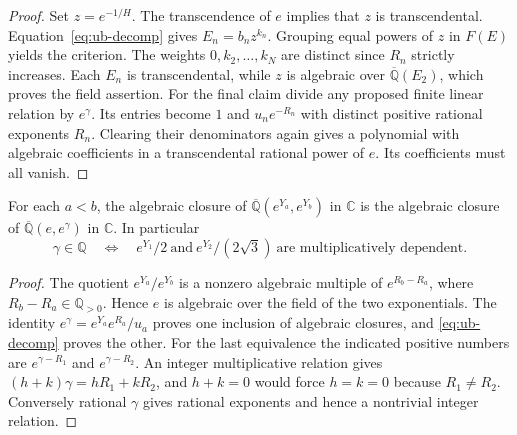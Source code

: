\documentclass[11pt,a4paper]{article}
\theoremstyle{definition}\newtheorem{definition}[theorem]{Definition}\newtheorem{example}[theorem]{Example}
\theoremstyle{remark}\newtheorem{remark}[theorem]{Remark}
\newcommand{\Q}{\mathbb Q}\newcommand{\Z}{\mathbb Z}\newcommand{\R}{\mathbb R}\newcommand{\N}{\mathbb N}
\begin{document}
\begin{proof}
Set $z=e^{-1/H}$. The transcendence of $e$ implies that $z$ is
transcendental. Equation~\eqref{eq:ub-decomp} gives
$E_n=b_nz^{k_n}$. Grouping equal powers of $z$ in $F(E)$ yields the
criterion. The weights $0,k_2,\ldots,k_N$ are distinct since $R_n$
strictly increases. Each $E_n$ is transcendental, while $z$ is
algebraic over $\overline{\Q}(E_2)$, which proves the field assertion.
For the final claim divide any proposed finite linear relation by
$e^\gamma$. Its entries become $1$ and $u_ne^{-R_n}$ with distinct
positive rational exponents $R_n$. Clearing their denominators again
gives a polynomial with algebraic coefficients in a transcendental
rational power of $e$. Its coefficients must all vanish.
\end{proof}

\begin{corollary}
\label{cor:ub-exp-gamma}
For each $a<b$, the algebraic closure of
$\overline{\Q}(e^{Y_a},e^{Y_b})$ in $\mathbb C$ is the algebraic
closure of $\overline{\Q}(e,e^\gamma)$ in $\mathbb C$. In particular
\[
 \gamma\in\Q\quad\Longleftrightarrow\quad
 e^{Y_1}/2\ \text{and}\ e^{Y_2}/(2\sqrt3)
 \ \text{are multiplicatively dependent}.
\]
\end{corollary}

\begin{proof}
The quotient $e^{Y_a}/e^{Y_b}$ is a nonzero algebraic multiple of
$e^{R_b-R_a}$, where $R_b-R_a\in\Q_{>0}$. Hence $e$ is algebraic over
the field of the two exponentials. The identity
$e^\gamma=e^{Y_a}e^{R_a}/u_a$ proves one inclusion of algebraic
closures, and \eqref{eq:ub-decomp} proves the other. For the last
equivalence the indicated positive numbers are
$e^{\gamma-R_1}$ and $e^{\gamma-R_2}$. An integer multiplicative
relation gives $(h+k)\gamma=hR_1+kR_2$, and $h+k=0$ would force
$h=k=0$ because $R_1\ne R_2$. Conversely rational $\gamma$ gives
rational exponents and hence a nontrivial integer relation.
\end{proof}
\end{document}
